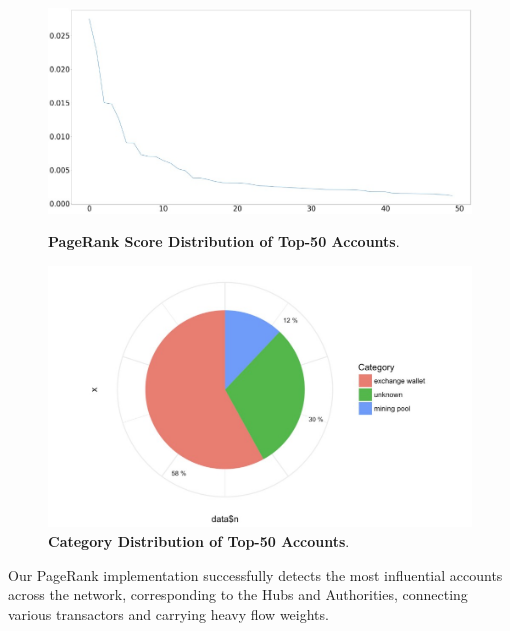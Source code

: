 \begin{figure}[t]
 \begin{minipage}[b]{.5\textwidth}
\includegraphics[width=1\columnwidth]{images/7_implemenation_and_usecases/pagerank-score-distribution-of-top-50-accounts.jpeg}
\caption{\textbf{PageRank Score Distribution of Top-50 Accounts}.}
\label{fig:pagerank-score-distribution-of-top-50-accounts}
 \end{minipage}
 \begin{minipage}[b]{.5\textwidth}
\includegraphics[width=1.0\columnwidth]{images/7_implemenation_and_usecases/category-distribution-of-top-50-accounts.jpeg}
\caption{\textbf{Category Distribution of Top-50 Accounts}.}
\label{fig:category-distribution-of-top-50-accounts}
 \end{minipage}
\end{figure}

Our PageRank implementation successfully detects the most influential accounts across the network, corresponding to the Hubs and Authorities, connecting various transactors and carrying heavy flow weights.

